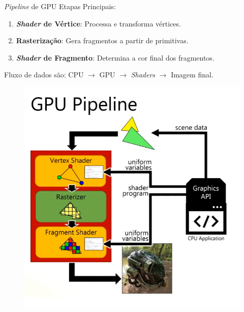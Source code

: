 \begin{frame}{\textit{Pipeline} de GPU}
    Etapas Principais:
    \begin{enumerate}
        \item \textbf{\textit{Shader} de Vértice}: Processa e transforma vértices.
        \item \textbf{Rasterização}: Gera fragmentos a partir de primitivas.
        \item \textbf{\textit{Shader} de Fragmento}: Determina a cor final dos fragmentos.
    \end{enumerate}

    Fluxo de dados são:  CPU $\to$ GPU $\to$ \textit{Shaders} $\to$ Imagem final.
    \begin{figure}[H]
        \includegraphics[scale=0.25]{./Imagens/gpu_pipeline.png}
    \end{figure}
\end{frame}

